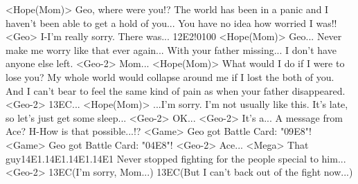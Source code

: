 <Hope(Mom)> Geo, where were you!? 
The world has been in a panic and I haven't been able to get a hold of you... 
You have no idea how worried I was!! 
<Geo> I-I'm really sorry. There was... 
{12}{E2}!{01}{00} 
<Hope(Mom)> Geo... Never make me worry like that ever again... 
With your father missing... 
I don't have anyone else left. 
<Geo-2> Mom... 
<Hope(Mom)> What would I do if I were to lose you? 
My whole world would collapse around me if I lost the both of you. 
And I can't bear to feel the same kind of pain as when your father disappeared. 
<Geo-2> {13}{EC}... 
<Hope(Mom)> ...I'm sorry. I'm not usually like this. 
It's late, so let's just get some sleep... 
<Geo-2> OK... 
<Geo-2> It's a... A message from Ace? 
H-How is that possible...!? 
<Game> Geo got Battle Card: "{09}{E8}"! 
<Game> Geo got Battle Card: "{04}{E8}"! 
<Geo-2> Ace... 
<Mega> That guy{14}{E1}.{14}{E1}.{14}{E1}.{14}{E1} 
Never stopped fighting for the people special to him... 
<Geo-2> {13}{EC}(I'm sorry, Mom...) 
{13}{EC}(But I can't back  out of the fight now...) 
